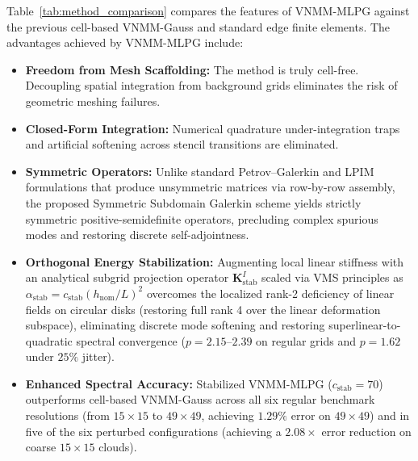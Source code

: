 \documentclass[preprint,12pt]{elsarticle}
\begin{document}
Table~\ref{tab:method_comparison} compares the features of VNMM-MLPG against the previous cell-based VNMM-Gauss and standard edge finite elements. The advantages achieved by VNMM-MLPG include:
\begin{itemize}
    \item \textbf{Freedom from Mesh Scaffolding:} The method is truly cell-free. Decoupling spatial integration from background grids eliminates the risk of geometric meshing failures.
    \item \textbf{Closed-Form Integration:} Numerical quadrature under-integration traps and artificial softening across stencil transitions are eliminated.
    \item \textbf{Symmetric Operators:} Unlike standard Petrov--Galerkin and LPIM formulations that produce unsymmetric matrices via row-by-row assembly, the proposed Symmetric Subdomain Galerkin scheme yields strictly symmetric positive-semidefinite operators, precluding complex spurious modes and restoring discrete self-adjointness.
    \item \textbf{Orthogonal Energy Stabilization:} Augmenting local linear stiffness with an analytical subgrid projection operator $\mathbf{K}_{\mathrm{stab}}^I$ scaled via VMS principles as $\alpha_{\mathrm{stab}} = c_{\mathrm{stab}}(h_{\mathrm{nom}}/L)^2$ overcomes the localized rank-2 deficiency of linear fields on circular disks (restoring full rank 4 over the linear deformation subspace), eliminating discrete mode softening and restoring superlinear-to-quadratic spectral convergence ($p = 2.15\text{--}2.39$ on regular grids and $p = 1.62$ under $25\%$ jitter).
    \item \textbf{Enhanced Spectral Accuracy:} Stabilized VNMM-MLPG ($c_{\mathrm{stab}} = 70$) outperforms cell-based VNMM-Gauss across all six regular benchmark resolutions (from $15\times 15$ to $49\times 49$, achieving $1.29\%$ error on $49\times 49$) and in five of the six perturbed configurations (achieving a $2.08\times$ error reduction on coarse $15\times 15$ clouds).
\end{itemize}
\end{document}
